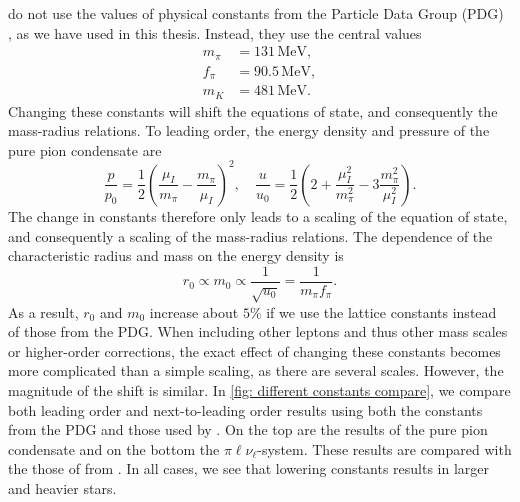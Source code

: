 \citeauthor{brandtNewClassCompact2018} do not use the values of physical constants from the Particle Data Group (PDG) \autocite{zylaReviewParticlePhysics2020}, as we have used in this thesis.
Instead, they use the central values~\autocite{adhikariQuarkPionAxial2021}
%
\begin{align}
    m_\pi &= 131\,\text{MeV},\\
    f_\pi &= 90.5\,\text{MeV},\\
    m_K &= 481\,\text{MeV}.
\end{align}
%
Changing these constants will shift the equations of state, and consequently the mass-radius relations.
To leading order, the energy density and pressure of the pure pion condensate are
%
\begin{equation}
    \frac{p}{p_0} = \frac{1}{2} \left(\frac{\mu_I}{m_\pi} - \frac{m_\pi}{\mu_I}\right)^2,
    \quad
    \frac{u}{u_0}
    = \frac{1}{2} \left(2 + \frac{\mu_I^2}{m_\pi^2} - 3\frac{m_\pi^2}{\mu_I^2}\right).
\end{equation}
%
The change in constants therefore only leads to a scaling of the equation of state, and consequently a scaling of the mass-radius relations.
The dependence of the characteristic radius and mass on the energy density is
%
\begin{equation}
    r_0 \propto m_0 \propto \frac{1}{\sqrt{u_0}} = \frac{1}{m_\pi f_\pi}.
\end{equation}
%
As a result, $r_0$ and $m_0$ increase about $5\%$ if we use the lattice constants instead of those from the PDG.
When including other leptons and thus other mass scales or higher-order corrections, the exact effect of changing these constants becomes more complicated than a simple scaling, as there are several scales.
However, the magnitude of the shift is similar.
In \autoref{fig: different constants compare}, we compare both leading order and next-to-leading order results using both the constants from the PDG and those used by \citeauthor{brandtNewClassCompact2018}.
On the top are the results of the pure pion condensate and on the bottom the $\pi\ell\nu_\ell$-system.
These results are compared with the those of \citeauthor{brandtNewClassCompact2018} from \autocite{brandtNewClassCompact2018}.
In all cases, we see that lowering constants results in larger and heavier stars.

